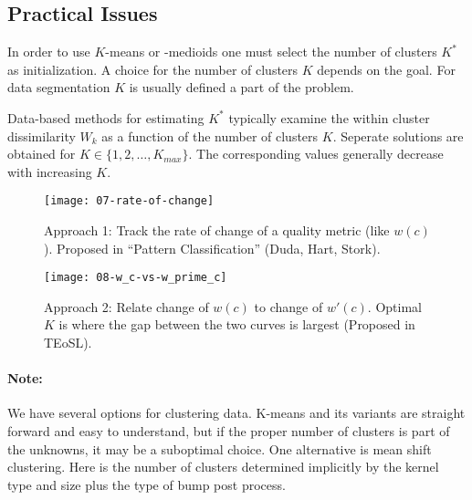  \subsection*{Practical Issues}
 In order to use \(K\)-means or -medioids one must select the number of clusters \(K^*\) as initialization. A choice for the number of clusters \(K\) depends on the goal. For data segmentation \(K\) is usually defined a part of the problem.

 Data-based methods for estimating \(K^*\) typically examine the within cluster dissimilarity \(W_k\) as a function of the number of clusters \(K\). Seperate solutions are obtained for \(K \in \{1,2,\dots,K_{max}\}\). The corresponding values generally decrease with increasing \(K\).

\begin{figure}[H]
 	\centering
 	\begin{minipage}[b]{0.49\textwidth}
   	\texttt{[image: 07-rate-of-change]}
   \caption{Approach 1: Track the rate of change of a quality metric (like $w(c)$). Proposed in ``Pattern Classification'' (Duda, Hart, Stork).}
 	\end{minipage}
 	\begin{minipage}[b]{0.49\textwidth}
   	\texttt{[image: 08-w\_c-vs-w\_prime\_c]}
   \caption{Approach 2: Relate change of $w(c)$ to change of $w'(c)$. Optimal \(K\) is where the gap between the two curves is largest (Proposed in TEoSL).}
 	\end{minipage}
\end{figure}

\paragraph{Note:}
We have several options for clustering data. K-means and its variants are straight forward and easy to understand, but if the proper number of clusters is part of the unknowns, it may be a suboptimal choice.
One alternative is mean shift clustering. Here is the number of clusters determined implicitly by the kernel type and size plus the type of bump post process.